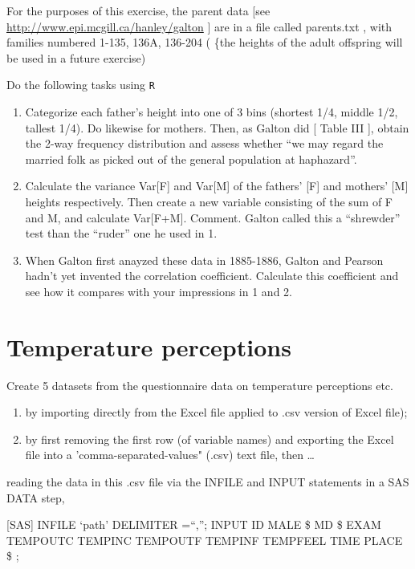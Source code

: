 \documentclass[]{book}
\begin{document}
For the purposes of this exercise, the parent data {[}see \url{http://www.epi.mcgill.ca/hanley/galton} {]} are in a file called parents.txt , with families numbered 1-135, 136A, 136-204 ( \{the heights of the adult offspring will be used in a future exercise)

Do the following tasks using \texttt{R}

\begin{enumerate}
\def\labelenumi{\arabic{enumi}.}
\item
  Categorize each father's height into one of 3 bins (shortest 1/4, middle 1/2, tallest 1/4). Do likewise for mothers. Then, as Galton did {[} Table III {]}, obtain the 2-way frequency distribution and assess whether ``we may regard the married folk as picked out of the general population at haphazard''.
\item
  Calculate the variance Var{[}F{]} and Var{[}M{]} of the fathers' {[}F{]} and mothers' {[}M{]} heights respectively. Then create a new variable consisting of the sum of F and M, and calculate Var{[}F+M{]}. Comment. Galton called this a ``shrewder'' test than the ``ruder'' one he used in 1.
\item
  When Galton first anayzed these data in 1885-1886, Galton and Pearson hadn't yet invented the correlation coefficient. Calculate this coefficient and see how it compares with your impressions in 1 and 2.
\end{enumerate}

\hypertarget{temperature-perceptions-1}{%
\section{Temperature perceptions}\label{temperature-perceptions-1}}

Create 5 datasets from the questionnaire data on temperature perceptions etc.

\begin{enumerate}
\def\labelenumi{(\roman{enumi})}
\item
  by importing directly from the Excel file applied to .csv version of Excel file);
\item
  by first removing the first row (of variable names) and exporting the Excel file into a 'comma-separated-values" (.csv) text file, then \ldots{}
\end{enumerate}

reading the data in this .csv file via the INFILE and INPUT statements in a SAS DATA step,

{[}SAS{]}
INFILE `path' DELIMITER =``,'';
INPUT ID MALE \$ MD \$ EXAM TEMPOUTC TEMPINC TEMPOUTF TEMPINF TEMPFEEL TIME PLACE \$ ;
\end{document}
